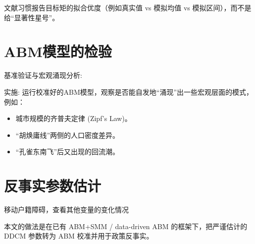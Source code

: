 \documentclass[
  a4paper,
  zihao=-4,
  fontset=mac,
  AutoFakeBold,
  AutoFakeSlant,
  oneside]{ctexbook}
\begin{document}
文献习惯报告目标矩的拟合优度（例如真实值 vs 模拟均值 vs 模拟区间），而不是给“显著性星号”。







\section{ABM模型的检验} %
\label{sub:abm模型的检验}


基准验证与宏观涌现分析:

实施: 运行校准好的ABM模型，观察是否能自发地“涌现”出一些宏观层面的模式，例如：
\begin{itemize}
  \item 城市规模的齐普夫定律 (Zipf's Law)。
  \item “胡焕庸线”两侧的人口密度差异。
  \item “孔雀东南飞”后又出现的回流潮。
\end{itemize}










\section{反事实参数估计}


移动户籍障碍，查看其他变量的变化情况


本文的做法是在已有 ABM+SMM / data-driven ABM 的框架下，把严谨估计的 DDCM 参数转为 ABM 校准并用于政策反事实。
\end{document}
